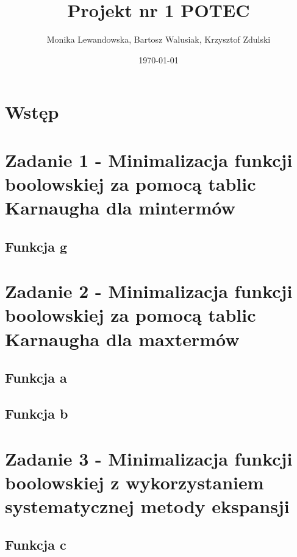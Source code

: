 \documentclass[a4paper, 12pt]{article}
\begin{document}
    \title{Projekt nr 1 POTEC}
    \author{Monika Lewandowska, Bartosz Walusiak, Krzysztof Zdulski}
    \date{\today}
    \maketitle

    \tableofcontents

    \section{Wstęp}\label{sec:intro}
    

    \newpage
    \section{Zadanie 1 - Minimalizacja funkcji boolowskiej za pomocą tablic Karnaugha dla mintermów}\label{sec:task-1}
    \subsection{Funkcja g}\label{subsec:fun-g}
    

    \newpage
    \section{Zadanie 2 - Minimalizacja funkcji boolowskiej za pomocą tablic Karnaugha dla maxtermów}\label{sec:task-2}
    \subsection{Funkcja a}\label{subsec:fun-a}
    

    \newpage
    \subsection{Funkcja b}\label{subsec:fun-b}
    

    \newpage
    \section{Zadanie 3 - Minimalizacja funkcji boolowskiej z wykorzystaniem systematycznej metody ekspansji}\label{sec:task-3}
    \subsection{Funkcja c}\label{subsec:fun-c}
    
\end{document}
